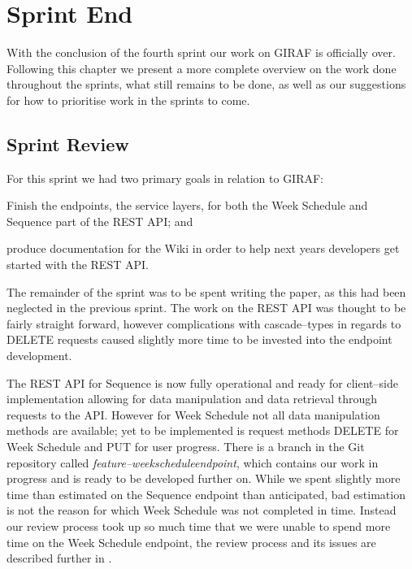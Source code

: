 \chapter{Sprint End}
With the conclusion of the fourth sprint our work on GIRAF is officially over.
Following this chapter we present a more complete overview on the work done throughout the sprints, what still remains to be done, as well as our suggestions for how to prioritise work in the sprints to come.

\section{Sprint Review}
For this sprint we had two primary goals in relation to GIRAF:
\begin{enumberate*}
\item Finish the endpoints, the service layers, for both the Week Schedule and Sequence part of the REST API; and
\item produce documentation for the Wiki in order to help next years developers get started with the REST API.
\end{enumberate*}
The remainder of the sprint was to be spent writing the paper, as this had been neglected in the previous sprint. 
The work on the REST API was thought to be fairly straight forward, however complications with cascade--types in regards to DELETE requests caused slightly more time to be invested into the endpoint development.

The REST API for Sequence is now fully operational and ready for client--side implementation allowing for data manipulation and data retrieval through requests to the API.
However for  Week Schedule not all data manipulation methods are available; yet to be implemented is request methods DELETE for Week Schedule and PUT for user progress.
There is a branch in the Git repository called \textit{feature--weekscheduleendpoint}, which contains our work in progress and is ready to be developed further on.
While we spent slightly more time than estimated on the Sequence endpoint than anticipated, bad estimation is not the reason for which Week Schedule was not completed in time.
Instead our review process took up so much time that we were unable to spend more time on the Week Schedule endpoint, the review process and its issues are described further in .

